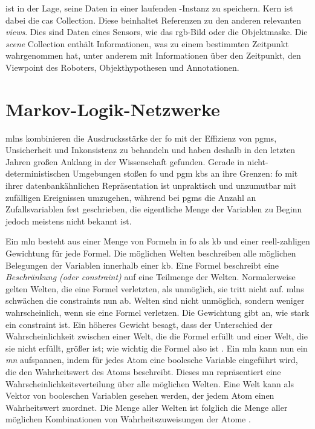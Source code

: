 \robosherlock ist in der Lage, seine Daten in einer laufenden \mongodb-Instanz zu speichern. Kern ist dabei die \gls{cas} Collection. Diese beinhaltet Referenzen zu den anderen relevanten \textit{views}. Dies sind Daten eines Sensors, wie das \gls{rgb}-Bild oder die Objektmaske. Die \textit{scene} Collection enthält Informationen, was \robosherlock zu einem bestimmten Zeitpunkt wahrgenommen hat, unter anderem mit Informationen über den Zeitpunkt, den Viewpoint des Roboters, Objekthypothesen und Annotationen. \cite{episodicMemory}



\section{Markov-Logik-Netzwerke}
\label{sec:mln}
\glspl{mln} kombinieren die Ausdrucksstärke der \gls{fo} mit der Effizienz von \glspl{pgm}, Unsicherheit und Inkonsistenz zu behandeln und haben deshalb in den letzten Jahren großen Anklang in der Wissenschaft gefunden. Gerade in nicht-deterministischen Umgebungen stoßen \gls{fo} und \gls{pgm} \glspl{kb} an ihre Grenzen: \gls{fo} mit ihrer datenbankähnlichen Repräsentation ist unpraktisch und unzumutbar mit zufälligen Ereignissen umzugehen, während bei \glspl{pgm} die Anzahl an Zufallsvariablen fest geschrieben, die eigentliche Menge der Variablen zu Beginn jedoch meistens nicht bekannt ist. \cite{nyga17} \par 

Ein \gls{mln} besteht aus einer Menge von Formeln in \gls{fo} als \acrlong{kb} und einer reell-zahligen Gewichtung für jede Formel. Die möglichen Welten beschreiben alle möglichen Belegungen der Variablen innerhalb einer \gls{kb}. Eine Formel beschreibt eine \textit{Beschränkung (oder constraint)} auf eine Teilmenge der Welten. Normalerweise gelten Welten, die eine Formel verletzten, als unmöglich, sie tritt nicht auf. \glspl{mln} schwächen die constraints nun ab. Welten sind nicht unmöglich, sondern weniger wahrscheinlich, wenn sie eine Formel verletzen. Die Gewichtung gibt an, wie stark ein constraint ist. Ein höheres Gewicht besagt, dass der Unterschied der Wahrscheinlichkeit zwischen einer Welt, die die Formel erfüllt und einer Welt, die sie nicht erfüllt, größer ist; wie wichtig die Formel also ist \cite{mln}. Ein \gls{mln} kann nun ein \textit{\gls{mn}} aufspannen, indem für jedes Atom eine boolesche Variable eingeführt wird, die den Wahrheitswert des Atoms beschreibt. Dieses \gls{mn} repräsentiert eine Wahrscheinlichkeitsverteilung über alle möglichen Welten. Eine Welt kann als Vektor von booleschen Variablen gesehen werden, der jedem Atom einen Wahrheitswert zuordnet. Die Menge aller Welten ist folglich die Menge aller möglichen Kombinationen von Wahrheitszuweisungen der Atome \cite{nyga17}. \par

